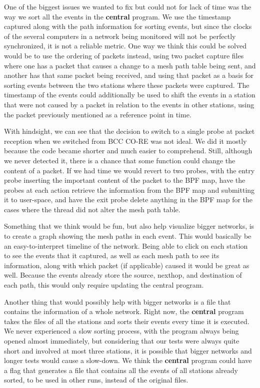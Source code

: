 One of the biggest issues we wanted to fix but could not for lack of time was
the way we sort all the events in the \textbf{central} program. We use the
timestamp captured along with the path information for sorting events, but since
the clocks of the several computers in a network being monitored will not be
perfectly synchronized, it is not a reliable metric. One way we think this could
be solved would be to use the ordering of packets instead, using two packet
capture files where one has a packet that causes a change to a mesh path table
being sent, and another has that same packet being received, and using that
packet as a basis for sorting events between the two stations where these
packets were captured. The timestamp of the events could additionally be used to
shift the events in a station that were not caused by a packet in relation to
the events in other stations, using the packet previously mentioned as a
reference point in time.

With hindsight, we can see that the decision to switch to a single probe at
packet reception when we switched from \ac{BCC} \ac{CO-RE} was not ideal. We did
it mostly because the code became shorter and much easier to comprehend. Still,
although we never detected it, there is a chance that some function could change
the content of a packet. If we had time we would revert to two probes, with the
entry probe inserting the important content of the packet to the BPF map, have
the probes at each action retrieve the information from the BPF map and
submitting it to user-space, and have the exit probe delete anything in the BPF
map for the cases where the thread did not alter the mesh path table.

Something that we think would be fun, but also help visualize bigger networks,
is to create a graph showing the mesh paths in each event. This would basically
be an easy-to-interpret timeline of the network. Being able to click on each
station to see the events that it captured, as well as each mesh path to see its
information, along with which packet (if applicable) caused it would be great as
well. Because the events already store the source, nexthop, and destination of
each path, this would only require updating the central program.

Another thing that would possibly help with bigger networks is a file that
contains the information of a whole network. Right now, the \textbf{central}
program takes the files of all the stations and sorts their events every time it
is executed. We never experienced a slow sorting process, with the program
always being opened almost immediately, but considering that our tests were
always quite short and involved at most three stations, it is possible that
bigger networks and longer tests would cause a slow-down. We think the
\textbf{central} program could have a flag that generates a file that contains
all the events of all stations already sorted, to be used in other runs, instead
of the original files.

